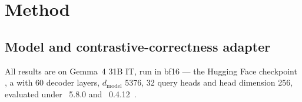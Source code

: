 \section{Method}\label{sec:method}

\subsection{Model and contrastive-correctness adapter}\label{method:model}

All results are on Gemma~4 31B IT, run in bf16 --- the Hugging Face checkpoint
, a
 with 60 decoder layers, $d_{\mathrm{model}}$
5376, 32 query heads and head dimension 256, evaluated under
~5.8.0 and ~0.4.12~\citep{LMEvalHarness}.

